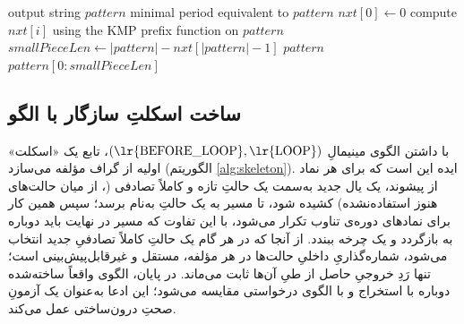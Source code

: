 \documentclass[a4paper,12pt]{article}
\numberwithin{algorithm}{section}
\begin{document}
\begin{algorithm}[H]
\caption{}
\label{alg:minpattern}
\begin{latin}
\begin{algorithmic}[1]
\REQUIRE output string $pattern$
\ENSURE minimal period equivalent to $pattern$
\STATE $nxt[0] \leftarrow 0$
    \STATE compute $nxt[i]$ using the KMP prefix function on $pattern$
\ENDFOR
\STATE $smallPieceLen \leftarrow |pattern| - nxt[|pattern|-1]$
    \RETURN $pattern$ 
\ENDIF
\RETURN $pattern[0 : smallPieceLen]$
\end{algorithmic}
\end{latin}
\end{algorithm}

\subsection{ساخت اسکلتِ سازگار با الگو}
با داشتن الگوی مینیمالِ $(\text{\lr{BEFORE\_LOOP}}, \text{\lr{LOOP}})$، تابع  یک «اسکلت» اولیه از گراف مؤلفه می‌سازد (الگوریتم \ref{alg:skeleton}). ایده این است که برای هر نماد از پیشوند، یک یال جدید به‌سمت یک حالتِ تازه و کاملاً تصادفی (، از میان حالت‌های هنوز استفاده‌نشده) کشیده شود، تا مسیر به یک حالتِ به‌نام  برسد؛ سپس همین کار برای نمادهای دوره‌ی تناوب تکرار می‌شود، با این تفاوت که مسیر در نهایت باید دوباره به  بازگردد و یک چرخه ببندد. از آنجا که در هر گام یک حالتِ کاملاً تصادفیِ جدید انتخاب می‌شود، شماره‌گذاریِ داخلیِ حالت‌ها در هر مؤلفه، مستقل و غیرقابل‌پیش‌بینی است؛ تنها رَدِ خروجیِ حاصل از طیِ آن‌ها ثابت می‌ماند. در پایان، الگوی واقعاً ساخته‌شده دوباره با  استخراج و با الگوی درخواستی مقایسه می‌شود؛ این ادعا به‌عنوان یک آزمونِ صحتِ درون‌ساختی عمل می‌کند.
\end{document}
